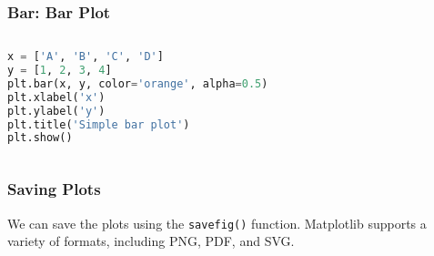 \documentclass[beamer, en, version=2.0]{huangfusl-template}
\begin{document}
    \begin{frame}[fragile]
        \frametitle{Bar: Bar Plot}

        \begin{columns}
        \begin{column}{0.5\textwidth}
\begin{lstlisting}[language=python, breaklines]
x = ['A', 'B', 'C', 'D']
y = [1, 2, 3, 4]
plt.bar(x, y, color='orange', alpha=0.5)
plt.xlabel('x')
plt.ylabel('y')
plt.title('Simple bar plot')
plt.show()
\end{lstlisting}
        \end{column}
        \begin{column}{0.5\textwidth}
            
        \end{column}
        \end{columns}
    \end{frame}
    \begin{frame}[fragile]
        \frametitle{Saving Plots}

        We can save the plots using the {\color{blue}\footnotesize\verb|savefig()|} function. Matplotlib supports a variety of formats, including PNG, PDF, and SVG.
    \end{frame}
\end{document}
